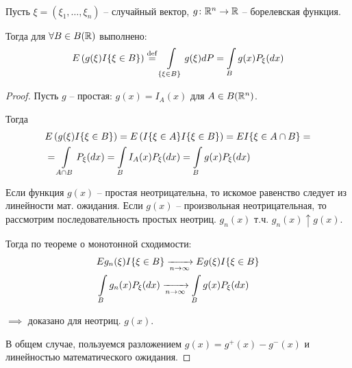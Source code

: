 \begin{theorem}~

  Пусть $\xi = (\xi_1, \ldots, \xi_n)$ -- случайный вектор, 
  $g\colon \mathbb{R}^n \to \mathbb{R}$ -- борелевская функция. 

  Тогда для $\forall B \in B(\mathbb{R})$ выполнено:
  \begin{align*}
    E\left( g(\xi) I\{ \xi \in B \} \right) \stackrel{\mathrm{def}}{=} \int\limits_{\{ \xi \in B \}} g(\xi) dP = 
    \int\limits_B g(x) P_{\xi} (dx)
  \end{align*}

  \begin{proof}
    Пусть $g$ -- простая: $g(x) = I_{A}(x)$ для $A \in B(\mathbb{R}^n)$.

    Тогда
    \begin{align*}
      &E\left( g(\xi) I \{ \xi \in B \} \right) = E\left( I \{ \xi \in A \} I \{ \xi \in B \} \right) =
      E I \{ \xi \in A \cap B \} = \\
      &= \int\limits_{A \cap B} P_{\xi} (dx) = \int\limits_{B} I_{A} (x) P_{\xi} (dx) 
      = \int\limits_B g(x) P_{\xi} (dx)
    \end{align*}

    Если функция $g(x)$ -- простая неотрицательна, 
    то искомое равенство следует из линейности мат. ожидания.
    Если $g(x)$ -- произвольная неотрицательная, 
    то рассмотрим последовательность простых неотриц. $g_n(x)$ т.ч. $g_n(x) \uparrow g(x)$.

    Тогда по теореме о монотонной сходимости:
    \begin{align*}
      &E g_n(\xi) I \{ \xi \in B \} \xrightarrow[n \to \infty]{} E g(\xi) I \{ \xi \in B \}\\
      &\int\limits_B g_n (x) P_{\xi} (dx) \xrightarrow[n \to \infty]{} \int\limits_B g(x) P_{\xi} (dx)
    \end{align*}

    $\implies$ доказано для неотриц. $g(x)$.

    В общем случае, пользуемся разложением $g(x) = g^+(x) - g^-(x)$ и линейностью математического ожидания.
  \end{proof}
\end{theorem}

